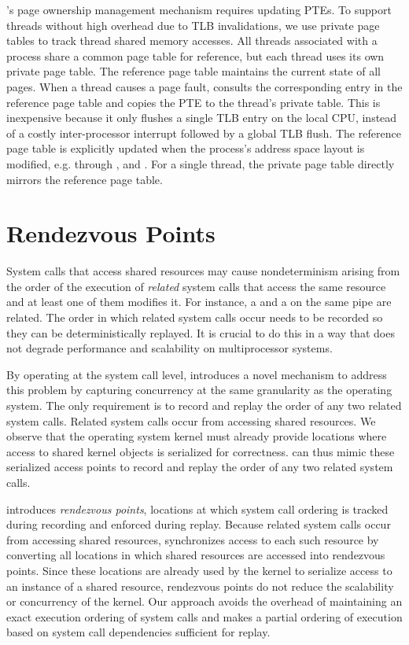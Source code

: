 \scribe{}'s page ownership management mechanism requires updating
PTEs.  To support threads without high
overhead due to TLB invalidations, we use private page tables to
track thread shared memory accesses.  All threads associated with
a process share a common
page table for reference, but each thread uses its own private
page table.  The reference page table maintains the current
state of all pages.  When a thread causes a page fault, \scribe{}
consults the corresponding entry in the reference page table and
copies the PTE to the thread's private table. This is inexpensive
because it only flushes a single TLB entry on the local CPU, instead
of a costly inter-processor interrupt followed by a global TLB flush.
The reference page table
is explicitly updated when the process's
address space layout is modified, e.g. through ,  and
. For a
single thread, the private page table directly mirrors the reference
page table. 

 

	

 

  
\section{Rendezvous Points}
\label{scribe:sec:rendezvous}

System calls that access shared resources may cause nondeterminism
arising from the order of the execution of {\em related} system calls
that access the same resource and at least one of them modifies it.
For instance, a  and a  on the same pipe are
related. The order in which related system calls occur needs to be
recorded so they can be deterministically replayed.  It is crucial
to do this in a way that does not degrade performance and scalability
on multiprocessor systems.

By operating at the system call level, \scribe{} introduces a novel
mechanism to address this problem by capturing concurrency at the same
granularity as the operating system.  The only requirement is
to record and replay the order of any two related system calls.
Related system calls occur from accessing shared resources.  We
observe that the operating system kernel must already provide
locations where access to shared kernel objects is serialized for
correctness.  \scribe{} can thus mimic these serialized access
points to record and replay the order of any two related system calls.

\scribe{} introduces {\em rendezvous points}, locations at which
system call ordering is tracked during recording and enforced during
replay.  Because related system calls occur from accessing shared
resources, \scribe{} synchronizes access to each such resource by
converting all locations in which shared resources are accessed into
rendezvous points.  Since these locations are already used by the
kernel to serialize access to an instance of a shared resource,
rendezvous points do not reduce the scalability or concurrency of the
kernel.  Our approach avoids the overhead of maintaining an exact
execution ordering of system calls and makes a partial ordering of
execution based on system call dependencies sufficient for replay.

